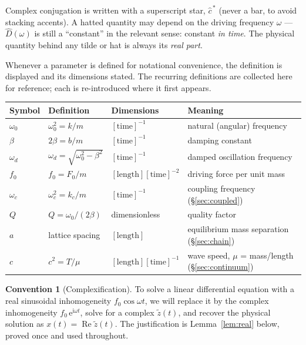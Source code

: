 \documentclass[11pt]{article}
\theoremstyle{plain}
\theoremstyle{definition}
\newtheorem{convention}[lemma]{Convention}
\theoremstyle{remark}
\newcommand{\ee}{\mathrm{e}}
\newcommand{\ii}{\mathrm{i}}
\newcommand{\Rre}{\operatorname{Re}}
\begin{document}
\noindent
Complex conjugation is written with a superscript star, $\hat c^{\,*}$
(never a bar, to avoid stacking accents). A hatted quantity may depend on the
driving frequency $\omega$ --- $\hat D(\omega)$ is still a ``constant'' in
the relevant sense: constant \emph{in time}. The physical quantity behind any
tilde or hat is always its \emph{real part}.

Whenever a parameter is defined for notational convenience, the definition is
displayed and its dimensions stated. The recurring definitions are collected
here for reference; each is re-introduced where it first appears.

\begin{center}
\begin{tabular}{llll}
\toprule
Symbol & Definition & Dimensions & Meaning \\
\midrule
$\omega_0$ & $\omega_0^2 = k/m$ & $[\text{time}]^{-1}$ & natural (angular) frequency \\
$\beta$ & $2\beta = b/m$ & $[\text{time}]^{-1}$ & damping constant \\
$\omega_d$ & $\omega_d = \sqrt{\omega_0^2-\beta^2}$ & $[\text{time}]^{-1}$ & damped oscillation frequency \\
$f_0$ & $f_0 = F_0/m$ & $[\text{length}][\text{time}]^{-2}$ & driving force per unit mass \\
$\omega_c$ & $\omega_c^2 = k_c/m$ & $[\text{time}]^{-1}$ & coupling frequency (\S\ref{sec:coupled}) \\
$Q$ & $Q = \omega_0/(2\beta)$ & dimensionless & quality factor \\
$a$ & lattice spacing & $[\text{length}]$ & equilibrium mass separation (\S\ref{sec:chain}) \\
$c$ & $c^2 = T/\mu$ & $[\text{length}][\text{time}]^{-1}$ & wave speed, $\mu$ = mass/length (\S\ref{sec:continuum}) \\
\bottomrule
\end{tabular}
\end{center}

\begin{convention}[Complexification]\label{conv:complex}
To solve a linear differential equation with a real sinusoidal inhomogeneity
$f_0\cos\omega t$, we will replace it by the complex inhomogeneity
$f_0\,\ee^{\ii\omega t}$, solve for a complex $\tilde z(t)$, and recover the
physical solution as $x(t) = \Rre \tilde z(t)$. The justification is
Lemma~\ref{lem:real} below, proved once and used throughout.
\end{convention}
\end{document}
